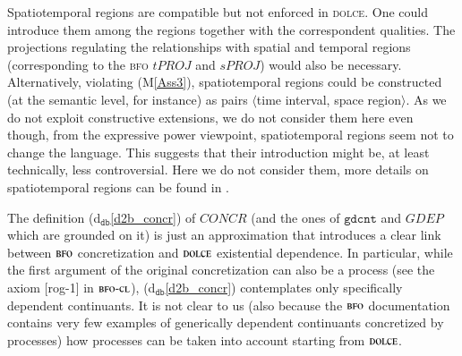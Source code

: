 \documentclass[ao]{iosart2x}
\newcommand{\nb}[1]{\textcolor{red}{$|$}\marginpar{\hspace*{-0cm}\parbox{20mm}{\scriptsize\raggedright\textcolor{red}{#1}}}}
\newcommand{\bflist}{\begin{list}{}{\setlength{\topsep}{2mm}\setlength{\parsep}{0mm}\setlength{\leftmargin}{9.2mm}\setlength{\labelwidth}{8mm}}}
\newcommand{\eflist}{\end{list}}
\newcommand{\dbDefLabel}{\textrm{d$_\texttt{db}$}}
\newcommand{\refdbdf}[1]{({\dbDefLabel}\ref{#1})}
\newcommand{\pr}[1]{\mathtt{#1}}
\newcommand{\prbfo}[1]{{\textit{{#1}}}}
\newcommand{\cn}[1]{\mathtt{#1}}
\newcommand\textequal{%
 \rule[.08ex]{5pt}{0.35pt}\llap{\rule[.78ex]{5pt}{0.35pt}}}
\newcommand{\sdef}{{\hspace{1.5pt}:\hspace{-2.5pt}\textequal\hspace{3pt}}}
\newcommand{\dolce}{{\textsc{dolce}}}
\newcommand{\bfo}{{\textsc{bfo}}}
\newcommand{\bfocl}{{\textsc{bfo-cl}}}
\newcommand {\SLCd} {\ensuremath{\pr{SLC}}}
\newcommand {\TLCd} {\ensuremath{\pr{TLC}}}
\newcommand{\gdcntbcat}{\cn{gdcnt}}
\newcommand{\procbcat}{\cn{proc}}
\newcommand{\pbndbcat}{\cn{pbnd}}
\newcommand{\bfoiof}[1]{{\,::_{#1\:\!}}}
\newcommand{\bfogdep}{\prbfo{GDEP}}
\newcommand{\bfosregof}{\prbfo{sREG}}
\newcommand{\bfosregofocc}{\prbfo{sREG_O}}
\newcommand{\bfoconcr}{\prbfo{CONCR}}
\newcommand{\bfotproj}{\prbfo{tPROJ}}
\newcommand{\bfosproj}{\prbfo{sPROJ}}
\begin{document}
Spatiotemporal regions are compatible but not enforced in {\dolce}. One could introduce them among the %
regions together with the correspondent qualities. The projections regulating the relationships with spatial and temporal regions (corresponding to the {\bfo} $\bfotproj$ and $\bfosproj$) would also be necessary.
Alternatively, violating (M\ref{Ass3}), spatiotemporal regions could be constructed (at the semantic level, for instance) as pairs $\langle$time interval, space region$\rangle$. 
%
As we do not exploit constructive extensions, %
we do not consider them here even though, from the expressive power viewpoint, spatiotemporal regions seem not to change the language. This suggests that their introduction might be, at least technically, less controversial. %
Here we do not consider them, more details on spatiotemporal regions can be found in \citep{D24}. %

The definition \refdbdf{d2b_concr} of $\bfoconcr$ (and the ones of $\gdcntbcat$ and $\bfogdep$ which are grounded on it) is just an approximation that introduces a clear link between $\bfo$ concretization and $\dolce$ existential dependence. In particular, while the first argument of the original concretization can also be a process (see the axiom [rog-1] in $\bfocl$), \refdbdf{d2b_concr} contemplates only specifically dependent continuants. It is not clear to us (also because the $\bfo$ documentation contains very few examples of generically dependent continuants concretized by processes) how processes can be taken into account starting from $\dolce$.   
\end{document}
